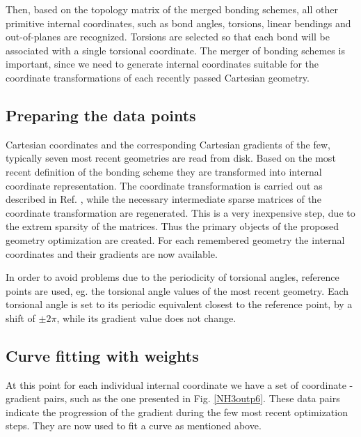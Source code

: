 \documentclass[prl,aps,twocolumn,showpacs,twocolumngrid,superbib]{revtex4}
\begin{document}
Then, based on the topology matrix of the merged bonding schemes,
all other primitive internal coordinates, such as bond angles,
torsions, linear bendings and out-of-planes are recognized. Torsions
are selected so that each bond will be associated with a single
torsional coordinate.
The merger of bonding schemes is important, since we need to
generate internal coordinates suitable for the coordinate
transformations of each recently passed Cartesian geometry.

\subsection{Preparing the data points}
Cartesian coordinates and the corresponding Cartesian gradients
of the few, typically seven most recent geometries are read from 
disk. Based on the most recent definition of the bonding scheme
they are transformed into internal coordinate representation.
The coordinate transformation is carried out as described in Ref.
\cite{nemeth_coordtrf1}, while the necessary intermediate sparse
matrices of the coordinate transformation are regenerated. This
is a very inexpensive step, due to the extrem sparsity
of the matrices.
Thus the primary objects of the proposed geometry optimization
are created. For each remembered geometry the internal coordinates
and their gradients are now available.

In order to avoid problems due to the periodicity of torsional angles,
reference points are used, eg. the torsional angle values 
of the most recent geometry. Each torsional angle is
set to its periodic equivalent 
closest to the reference point, by a 
shift of $\pm 2\pi$, while its gradient value does not change.

\subsection{Curve fitting with weights}
At this point for each individual internal coordinate we have a set of 
coordinate - gradient pairs, such as the one presented in 
Fig. \ref{NH3outp6}. These data pairs indicate the progression
of the gradient during the few most recent optimization steps.
They are now used to fit a curve as mentioned above.
\end{document}
